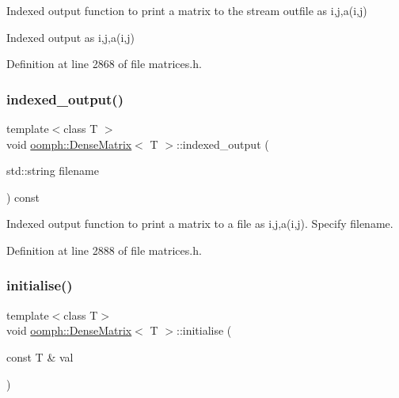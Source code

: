 Indexed output function to print a matrix to the stream outfile as i,j,a(i,j) 

Indexed output as i,j,a(i,j) 

Definition at line 2868 of file matrices.\+h.

\mbox{\label{classoomph_1_1DenseMatrix_a5730d359fa98ea501ab7115147a4bd87}} 
\subsubsection{\texorpdfstring{indexed\+\_\+output()}{indexed\_output()}\hspace{0.1cm}{\footnotesize\ttfamily [2/2]}}
{\footnotesize\ttfamily template$<$class T $>$ \\
void \hyperlink{classoomph_1_1DenseMatrix}{oomph\+::\+Dense\+Matrix}$<$ T $>$\+::indexed\+\_\+output (\begin{DoxyParamCaption}\item[{std\+::string}]{filename }\end{DoxyParamCaption}) const}



Indexed output function to print a matrix to a file as i,j,a(i,j). Specify filename. 



Definition at line 2888 of file matrices.\+h.

\mbox{\label{classoomph_1_1DenseMatrix_aafcfbb0309fdcbd84f8654fe1b5601fd}} 
\subsubsection{\texorpdfstring{initialise()}{initialise()}}
{\footnotesize\ttfamily template$<$class T$>$ \\
void \hyperlink{classoomph_1_1DenseMatrix}{oomph\+::\+Dense\+Matrix}$<$ T $>$\+::initialise (\begin{DoxyParamCaption}\item[{const T \&}]{val }\end{DoxyParamCaption})\hspace{0.3cm}{\ttfamily [inline]}}



